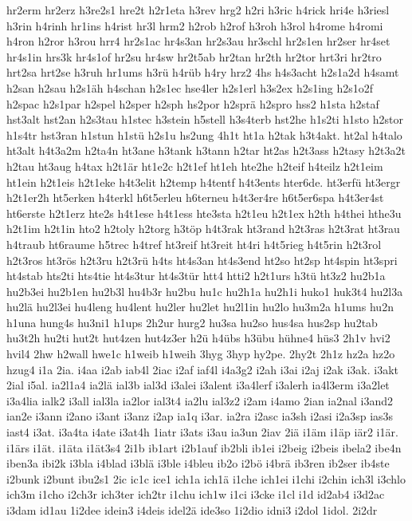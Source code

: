 {hr2erm
hr2erz
h3re2s1
hre2t
h2r1eta
h3rev
hrg2
h2ri
h3ric
h4rick
hri4e
h3riesl
h3rin
h4rinh
hr1ins
h4rist
hr3l
hrm2
h2rob
h2rof
h3roh
h3rol
h4rome
h4romi
h4ron
h2ror
h3rou
hrr4
hr2s1ac
hr4s3an
hr2s3au
hr3schl
hr2s1en
hr2ser
hr4set
hr4s1in
hrs3k
hr4s1of
hr2su
hr4sw
hr2t5ab
hr2tan
hr2th
hr2tor
hrt3ri
hr2tro
hrt2sa
hrt2se
h3ruh
hr1ums
h3rü
h4rüb
h4ry
hrz2
4hs
h4s3acht
h2s1a2d
h4samt
h2san
h2sau
h2s1äh
h4schan
h2s1ec
hse4ler
h2s1erl
h3s2ex
h2s1ing
h2s1o2f
h2spac
h2s1par
h2spel
h2sper
h2sph
hs2por
h2sprä
h2spro
hss2
h1sta
h2staf
hst3alt
hst2an
h2s3tau
h1stec
h3stein
h5stell
h3s4terb
hst2he
h1s2ti
h1sto
h2stor
h1s4tr
hst3ran
h1stun
h1stü
h2s1u
hs2ung
4h1t
ht1a
h2tak
h3t4akt.
ht2al
h4talo
ht3alt
h4t3a2m
h2ta4n
ht3ane
h3tank
h3tann
h2tar
ht2as
h2t3ass
h2tasy
h2t3a2t
h2tau
ht3aug
h4tax
h2t1är
ht1e2c
h2t1ef
ht1eh
hte2he
h2teif
h4teilz
h2t1eim
ht1ein
h2t1eis
h2t1eke
h4t3elit
h2temp
h4tentf
h4t3ents
hter6de.
ht3erfü
ht3ergr
h2t1er2h
ht5erken
h4terkl
h6t5erleu
h6terneu
h4t3er4re
h6t5er6spa
h4t3er4st
ht6erste
h2t1erz
hte2s
h4t1ese
h4t1ess
hte3sta
h2t1eu
h2t1ex
h2th
h4thei
hthe3u
h2t1im
h2t1in
hto2
h2toly
h2torg
h3töp
h4t3rak
ht3rand
h2t3ras
h2t3rat
ht3rau
h4traub
ht6raume
h5trec
h4tref
ht3reif
ht3reit
ht4ri
h4t5rieg
h4t5rin
h2t3rol
h2t3ros
ht3rös
h2t3ru
h2t3rü
h4ts
ht4s3an
ht4s3end
ht2so
ht2sp
ht4spin
ht3spri
ht4stab
hts2ti
hts4tie
ht4s3tur
ht4s3tür
htt4
htti2
h2t1urs
h3tü
ht3z2
hu2b1a
hu2b3ei
hu2b1en
hu2b3l
hu4b3r
hu2bu
hu1c
hu2h1a
hu2h1i
huko1
huk3t4
hu2l3a
hu2lä
hu2l3ei
hu4leng
hu4lent
hu2ler
hu2let
hu2l1in
hu2lo
hu3m2a
h1ums
hu2n
h1una
hung4s
hu3ni1
h1ups
2h2ur
hurg2
hu3sa
hu2so
hus4sa
hus2sp
hu2tab
hu3t2h
hu2ti
hut2t
hut4zen
hut4z3er
h2ü
h4übs
h3übu
hühne4
hüs3
2h1v
hvi2
hvil4
2hw
h2wall
hwe1c
h1weib
h1weih
3hyg
3hyp
hy2pe.
2hy2t
2h1z
hz2a
hz2o
hzug4
i1a
2ia.
i4aa
i2ab
iab4l
2iac
i2af
iaf4l
i4a3g2
i2ah
i3ai
i2aj
i2ak
i3ak.
i3akt
2ial
i5al.
ia2l1a4
ia2lä
ial3b
ial3d
i3alei
i3alent
i3a4lerf
i3alerh
ia4l3erm
i3a2let
i3a4lia
ialk2
i3all
ial3la
ia2lor
ial3t4
ia2lu
ial3z2
i2am
i4amo
2ian
ia2nal
i3and2
ian2e
i3ann
i2ano
i3ant
i3anz
i2ap
ia1q
i3ar.
ia2ra
i2asc
ia3sh
i2asi
i2a3sp
ias3s
iast4
i3at.
i3a4ta
i4ate
i3at4h
1iatr
i3ats
i3au
ia3un
2iav
2iä
i1äm
i1äp
iär2
i1är.
i1ärs
i1ät.
i1äta
i1ät3s4
2i1b
ib1art
i2b1auf
ib2bli
ib1ei
i2beig
i2beis
ibela2
ibe4n
iben3a
ibi2k
i3bla
i4blad
i3blä
i3ble
i4bleu
ib2o
i2bö
i4brä
ib3ren
ib2ser
ib4ste
i2bunk
i2bunt
ibu2s1
2ic
ic1c
ice1
ich1a
ich1ä
i1che
ich1ei
i1chi
i2chin
ich3l
i3chlo
ich3m
i1cho
i2ch3r
ich3ter
ich2tr
i1chu
ich1w
i1ci
i3cke
i1cl
i1d
id2ab4
i3d2ac
i3dam
id1au
1i2dee
idein3
i4deis
idel2ä
ide3so
1i2dio
idni3
i2dol
1idol.
2i2dr
}
